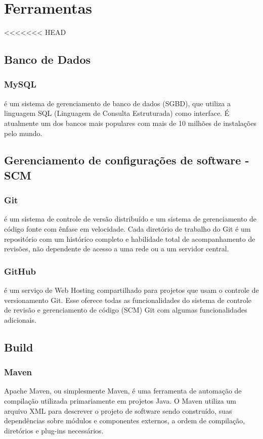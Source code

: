 \chapter{Ferramentas}

<<<<<<< HEAD
    \section{Banco de Dados}

	\subsection{MySQL} é um sistema de gerenciamento de banco de dados (SGBD),
	que utiliza a linguagem SQL (Linguagem de Consulta Estruturada) como
	interface. É atualmente um dos bancos mais populares com mais de 10
	milhões de instalações pelo mundo.

    \section{Gerenciamento de configurações de software - SCM}

	\subsection{Git} é um sistema de controle de versão distribuído e um
	sistema de gerenciamento de código fonte com ênfase em velocidade.
	Cada diretório de trabalho do Git é um repositório com um histórico
	completo e habilidade total de acompanhamento de revisões, não
	dependente de acesso a uma rede ou a um servidor central.

	\subsection{GitHub} é um serviço de Web Hosting compartilhado
	para projetos que usam o controle de versionamento Git.
	Esse oferece todas as funcionalidades do sistema de controle de
	revisão e gerenciamento de código (SCM) Git com algumas
	funcionalidades adicionais.

    \section{Build}

	\subsection{Maven} Apache Maven, ou simplesmente Maven, é uma
	ferramenta de automação de compilação utilizada primariamente
	em projetos Java. O Maven utiliza um arquivo XML para descrever
	o projeto de software sendo construído, suas dependências sobre
	módulos e componentes externos, a ordem de compilação,
	diretórios e plug-ins necessários.

